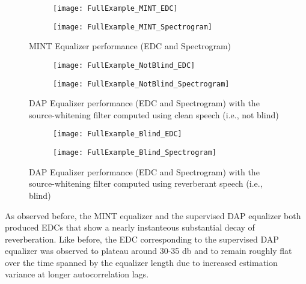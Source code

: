 \begin{figure}[H]
	\centering
	\begin{subfigure}[b]{0.38\textwidth}
		\centering
		\texttt{[image: FullExample\_MINT\_EDC]}
	\end{subfigure}
	\begin{subfigure}[b]{0.49\textwidth}
		\centering
		\texttt{[image: FullExample\_MINT\_Spectrogram]}
	\end{subfigure}
	\caption[MINT equalizer performance (EDC and spectrogram)]{MINT Equalizer performance (EDC and Spectrogram)}
	\label{fig:fullExample_MINT}
\end{figure}


\begin{figure}[H]
	\centering
	\begin{subfigure}[b]{0.38\textwidth}
		\centering
		\texttt{[image: FullExample\_NotBlind\_EDC]}
	\end{subfigure}
	\begin{subfigure}[b]{0.49\textwidth}
		\centering
		\texttt{[image: FullExample\_NotBlind\_Spectrogram]}
	\end{subfigure}
	\caption[Supervised DAP equalizer performance (EDC and spectrogram)]{DAP Equalizer performance (EDC and Spectrogram) with the source-whitening filter computed using clean speech (i.e., not blind)}
	\label{fig:fullExample_NotBlind}
\end{figure}


\begin{figure}[H]
	\centering
	\begin{subfigure}[b]{0.38\textwidth}
		\centering
		\texttt{[image: FullExample\_Blind\_EDC]}
	\end{subfigure}
	\begin{subfigure}[b]{0.49\textwidth}
		\centering
		\texttt{[image: FullExample\_Blind\_Spectrogram]}
	\end{subfigure}
	\caption[Blind DAP equalizer performance (EDC and spectrogram)]{DAP Equalizer performance (EDC and Spectrogram) with the source-whitening filter computed using reverberant speech (i.e., blind)}
	\label{fig:fullExample_Blind}
\end{figure}

As observed before, the MINT equalizer and the supervised DAP equalizer both produced EDCs that show a nearly instanteous substantial decay of reverberation. Like before, the EDC corresponding to the supervised DAP equalizer was observed to plateau around 30-35 \unit{\decibel} and to remain roughly flat over the time spanned by the equalizer length due to increased estimation variance at longer autocorrelation lags.


